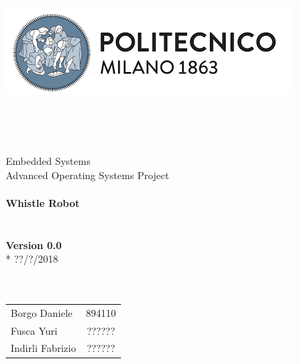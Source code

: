 \begin{titlepage}
	\begin{center}
		\includegraphics[scale=0.5]{files/images/PolimiLogo}
		\ \\ \ \\ \ \\ \ \\ \ \\
		\huge Embedded Systems \\
		\huge Advanced Operating Systems Project
		\ \\ \ \\
		\textbf{Whistle Robot}
		\ \\ \ \\ \ \\
		\textbf{Version 0.0}\\*
		??/?/2018
		\ \\ \ \\ \ \\
		\begin{tabular}{ l c }
			Borgo Daniele & 894110\\
			Fusca Yuri & ?????? \\
			Indirli Fabrizio & ?????? \\
		\end{tabular}
	\end{center}
\end{titlepage}